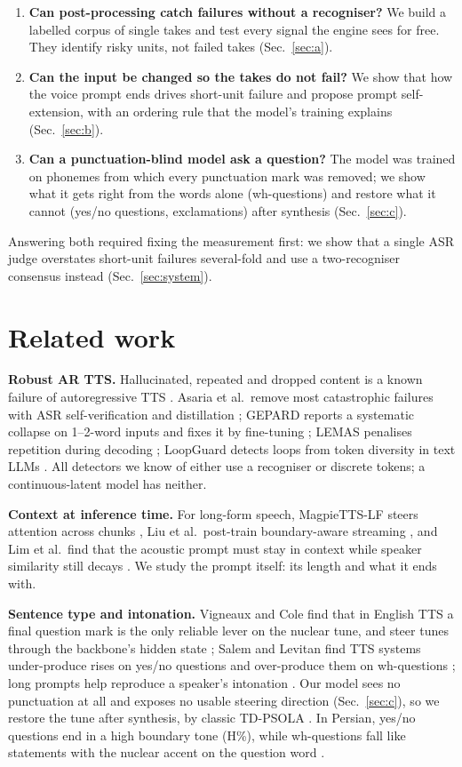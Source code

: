 \documentclass[conference]{IEEEtran}
\begin{document}
\begin{enumerate}
\item \textbf{Can post-processing catch failures without a recogniser?} We build a labelled corpus of
single takes and test every signal the engine sees for free. They identify risky units, not failed takes
(Sec.~\ref{sec:a}).
\item \textbf{Can the input be changed so the takes do not fail?} We show that how the voice prompt ends
drives short-unit failure and propose prompt self-extension, with an ordering rule that the model's
training explains (Sec.~\ref{sec:b}).
\item \textbf{Can a punctuation-blind model ask a question?} The model was trained on phonemes from which
every punctuation mark was removed; we show what it gets right from the words alone (wh-questions) and
restore what it cannot (yes/no questions, exclamations) after synthesis (Sec.~\ref{sec:c}).
\end{enumerate}
Answering both required fixing the measurement first: we show that a single ASR judge overstates short-unit
failures several-fold and use a two-recogniser consensus instead (Sec.~\ref{sec:system}).

\section{Related work}
\textbf{Robust AR TTS.} Hallucinated, repeated and dropped content is a known failure of autoregressive
TTS \cite{koel2025,borodin2026repetition}. Asaria et al.\ remove most catastrophic failures with ASR
self-verification and distillation \cite{asaria2026}; GEPARD reports a systematic collapse on 1--2-word
inputs and fixes it by fine-tuning \cite{gepard2026}; LEMAS penalises repetition during decoding
\cite{lemas2026}; LoopGuard detects loops from token diversity in text LLMs \cite{loopguard2026}. All
detectors we know of either use a recogniser or discrete tokens; a continuous-latent model has neither.

\textbf{Context at inference time.} For long-form speech, MagpieTTS-LF steers attention across chunks
\cite{magpielf2026}, Liu et al.\ post-train boundary-aware streaming \cite{liu2026boundary}, and Lim et al.\
find that the acoustic prompt must stay in context while speaker similarity still decays
\cite{lim2026longer}. We study the prompt itself: its length and what it ends with.

\textbf{Sentence type and intonation.} Vigneaux and Cole find that in English TTS a final question mark
is the only reliable lever on the nuclear tune, and steer tunes through the backbone's hidden state
\cite{vigneaux2026tunes}; Salem and Levitan find TTS systems under-produce rises on yes/no questions and
over-produce them on wh-questions \cite{salem2026question}; long prompts help reproduce a speaker's
intonation \cite{chen2026lptts}. Our model sees no punctuation at all and exposes no usable steering
direction (Sec.~\ref{sec:c}), so we restore the tune after synthesis, by classic TD-PSOLA \cite{psola1990}.
In Persian, yes/no questions end in a high boundary tone (H\%), while wh-questions fall like statements
with the nuclear accent on the question word \cite{sadat2011}.
\end{document}
